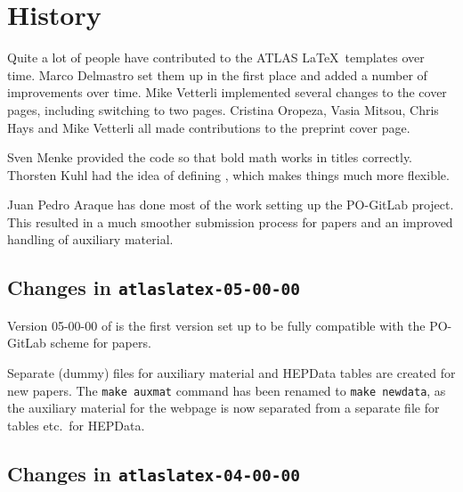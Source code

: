 \section{History}

Quite a lot of people have contributed to the ATLAS \LaTeX\ templates over time.
Marco Delmastro set them up in the first place and added a number of improvements over time.
Mike Vetterli implemented several changes to the cover pages, including switching to two pages.
Cristina Oropeza, Vasia Mitsou, Chris Hays and Mike Vetterli all made contributions to the preprint cover page.

Sven Menke provided the code so that bold math works in titles correctly.
Thorsten Kuhl had the idea of defining , which makes things much more flexible.

Juan Pedro Araque has done most of the work setting up the PO-GitLab project.
This resulted in a much smoother submission process for papers and
an improved handling of auxiliary material.


\subsection{Changes in \texttt{atlaslatex-05-00-00}}
\label{sec:atlaslatex5}

Version 05-00-00 of  is the first version set up
to be fully compatible with the PO-GitLab scheme for papers.

Separate (dummy) files for auxiliary material and HEPData tables are created for new papers.
The \verb|make auxmat| command has been renamed to \verb|make newdata|,
as the auxiliary material for the webpage is now separated
from a separate file for tables etc.\ for HEPData.


\subsection{Changes in \texttt{atlaslatex-04-00-00}}
\label{sec:atlaslatex4}

